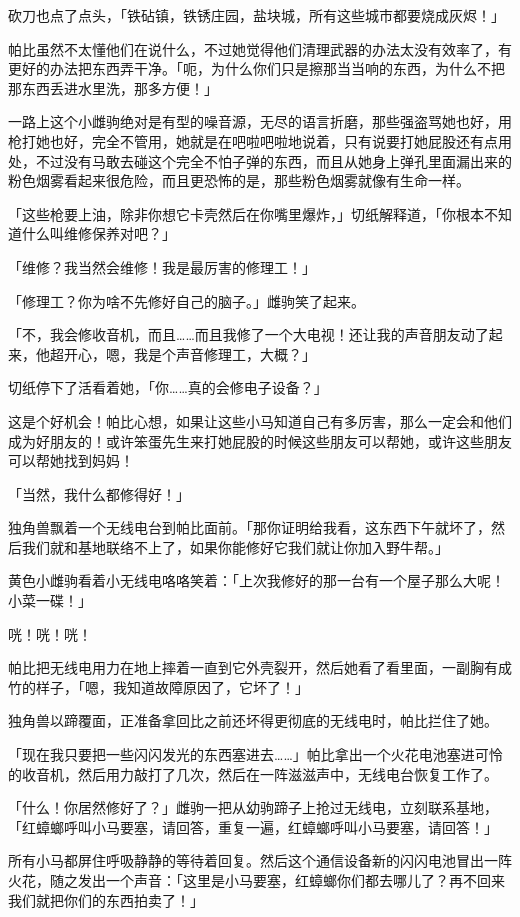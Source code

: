 砍刀也点了点头，「铁砧镇，铁锈庄园，盐块城，所有这些城市都要烧成灰烬！」

帕比虽然不太懂他们在说什么，不过她觉得他们清理武器的办法太没有效率了，有更好的办法把东西弄干净。「呃，为什么你们只是擦那当当响的东西，为什么不把那东西丢进水里洗，那多方便！」

一路上这个小雌驹绝对是有型的噪音源，无尽的语言折磨，那些强盗骂她也好，用枪打她也好，完全不管用，她就是在吧啦吧啦地说着，只有说要打她屁股还有点用处，不过没有马敢去碰这个完全不怕子弹的东西，而且从她身上弹孔里面漏出来的粉色烟雾看起来很危险，而且更恐怖的是，那些粉色烟雾就像有生命一样。

「这些枪要上油，除非你想它卡壳然后在你嘴里爆炸，」切纸解释道，「你根本不知道什么叫维修保养对吧？」

「维修？我当然会维修！我是最厉害的修理工！」

「修理工？你为啥不先修好自己的脑子。」雌驹笑了起来。

「不，我会修收音机，而且……而且我修了一个大电视！还让我的声音朋友动了起来，他超开心，嗯，我是个声音修理工，大概？」

切纸停下了活看着她，「你……真的会修电子设备？」

这是个好机会！帕比心想，如果让这些小马知道自己有多厉害，那么一定会和他们成为好朋友的！或许笨蛋先生来打她屁股的时候这些朋友可以帮她，或许这些朋友可以帮她找到妈妈！

「当然，我什么都修得好！」

独角兽飘着一个无线电台到帕比面前。「那你证明给我看，这东西下午就坏了，然后我们就和基地联络不上了，如果你能修好它我们就让你加入野牛帮。」

黄色小雌驹看着小无线电咯咯笑着：「上次我修好的那一台有一个屋子那么大呢！小菜一碟！」

咣！咣！咣！

帕比把无线电用力在地上摔着一直到它外壳裂开，然后她看了看里面，一副胸有成竹的样子，「嗯，我知道故障原因了，它坏了！」

独角兽以蹄覆面，正准备拿回比之前还坏得更彻底的无线电时，帕比拦住了她。

「现在我只要把一些闪闪发光的东西塞进去……」帕比拿出一个火花电池塞进可怜的收音机，然后用力敲打了几次，然后在一阵滋滋声中，无线电台恢复工作了。

「什么！你居然修好了？」雌驹一把从幼驹蹄子上抢过无线电，立刻联系基地，「红蟑螂呼叫小马要塞，请回答，重复一遍，红蟑螂呼叫小马要塞，请回答！」

所有小马都屏住呼吸静静的等待着回复。然后这个通信设备新的闪闪电池冒出一阵火花，随之发出一个声音：「这里是小马要塞，红蟑螂你们都去哪儿了？再不回来我们就把你们的东西拍卖了！」

